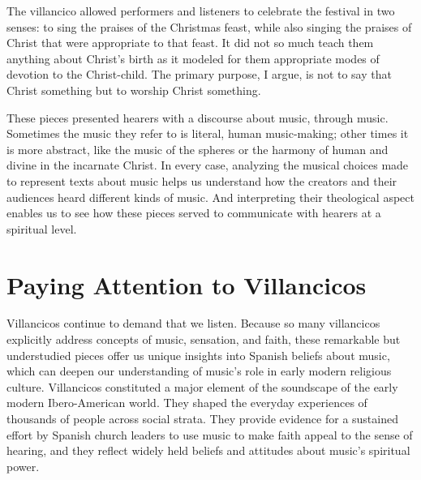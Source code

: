 The villancico allowed performers and listeners to celebrate the festival in two
senses: to sing the praises of the Christmas feast, while also singing the
praises of Christ that were appropriate to that feast. 
It did not so much teach them anything about Christ's birth as it modeled for
them appropriate modes of devotion to the Christ-child.
The primary purpose, I argue, is not to say that Christ  something but
to worship Christ  something.


These pieces presented hearers with a discourse about music, through music.
Sometimes the music they refer to is literal, human music-making; other times
it is more abstract, like the music of the spheres or the harmony of human and
divine in the incarnate Christ.
In every case, analyzing the musical choices made to represent texts about
music helps us understand how the creators and their audiences heard different
kinds of music.
And interpreting their theological aspect enables us to see how these pieces
served to communicate with hearers at a spiritual level.


\section{Paying Attention to Villancicos}

Villancicos continue to demand that we listen. 
Because so many villancicos explicitly address concepts of music, sensation,
and faith, these remarkable but understudied pieces offer us unique insights
into Spanish beliefs about music, which can deepen our understanding of
music's role in early modern religious culture.
Villancicos constituted a major element of the soundscape of the
early modern Ibero-American world.
They shaped the everyday experiences of thousands of people across social
strata.
They provide evidence for a sustained effort by Spanish church leaders to use
music to make faith appeal to the sense of hearing, and they reflect widely
held beliefs and attitudes about music's spiritual power.

